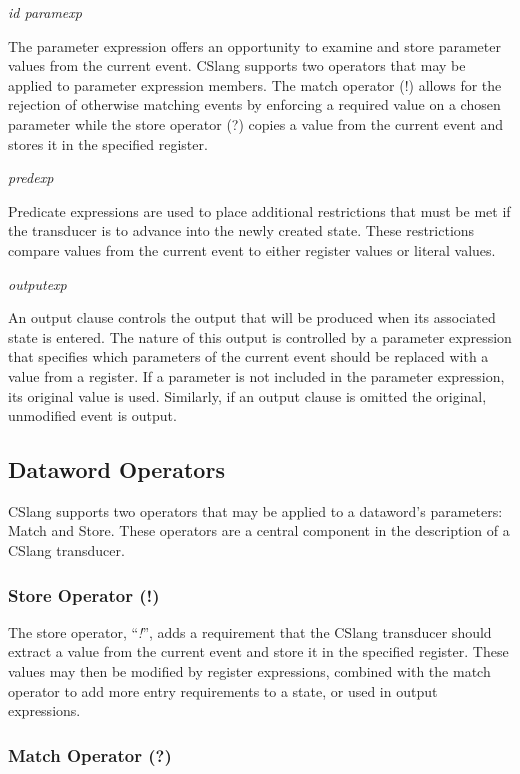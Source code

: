 \textit{id paramexp}

The parameter expression offers an opportunity to examine and store
parameter values from the current event.  CSlang supports two operators
that may be applied to parameter expression members.  The match operator
(!) allows for the rejection of otherwise matching events
by enforcing a required value on a
chosen parameter while the store operator (?) copies a value from the
current event and stores it in the specified register.


\textit{predexp}

Predicate expressions are used to place additional restrictions that must
be met if the transducer is to advance into the newly created state.  These
restrictions compare values from the current event to either register
values or literal values.

\textit{outputexp}

An output clause controls the output that will be produced when its
associated state is entered.  The nature of this output is controlled by a
parameter expression that specifies which parameters of the current event
should be replaced with a value from a register.  If a parameter is not
included in the parameter expression, its original value is used.
Similarly,
if an output clause is omitted the original, unmodified event is output.

\subsection{Dataword Operators}

CSlang supports two operators that may be applied to a dataword's
parameters: Match and Store.  These operators are a central component in
the description of a CSlang transducer.

\subsubsection{Store Operator (!)}

The store operator, ``\textit{!}'', adds a requirement that the
CSlang transducer should extract a value from the current event and store
it in the specified register.  These values may then be modified by
register expressions, combined with the match operator to add more
entry requirements to a state, or used in output expressions.

\subsubsection{Match Operator (?)}

